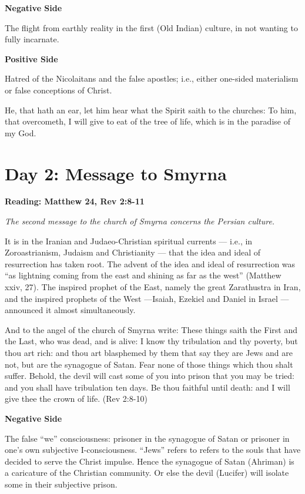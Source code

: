 \textbf{Negative Side}

The flight from earthly reality in the first (Old Indian) culture, in not wanting to fully incarnate.

\textbf{Positive Side}

Hatred of the Nicolaitans and the false apostles; i.e., either one-sided materialism or false conceptions of Christ.

\begin{quotex}
He, that hath an ear, let him hear what the Spirit saith to the churches: To him, that overcometh, I will give to eat of the tree of life, which is in the paradise of my God. 
\end{quotex}

\section{Day 2: Message to Smyrna}

\textbf{Reading: Matthew 24, Rev 2:8-11}

\emph{The second message to the church of Smyrna concerns the Persian culture.}

\begin{quotex}
It is in the Iranian and Judaeo-Christian spiritual currents — i.e., in Zoroastrianism, Judaism and Christianity — that the idea and ideal of resurrection has taken root. The advent of the idea and ideal of resurrection was ``as lightning coming from the east and shining as far as the west'' (Matthew xxiv, 27). The inspired prophet of the East, namely the great Zarathustra in Iran, and the inspired prophets of the West —Isaiah, Ezekiel and Daniel in Israel — announced it almost simultaneously.

\end{quotex}
And to the angel of the church of Smyrna write: These things saith the First and the Last, who was dead, and is alive: I know thy tribulation and thy poverty, but thou art rich: and thou art blasphemed by them that say they are Jews and are not, but are the synagogue of Satan. Fear none of those things which thou shalt suffer. Behold, the devil will cast some of you into prison that you may be tried: and you shall have tribulation ten days. Be thou faithful until death: and I will give thee the crown of life. (Rev 2:8-10)

\textbf{Negative Side}

The false ``we'' consciousness: prisoner in the synagogue of Satan or prisoner in one's own
subjective I-consciousness. ``Jews'' refers to refers to the souls that have decided to serve the Christ impulse. Hence the synagogue of Satan (Ahriman) is a caricature of the Christian community. Or else the devil (Lucifer) will isolate some in their subjective prison.

